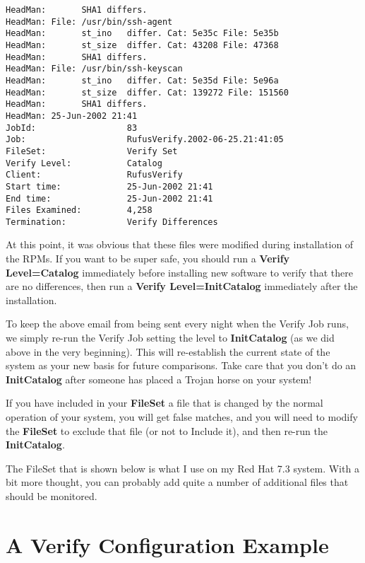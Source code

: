 \begin{verbatim}
HeadMan:       SHA1 differs.
HeadMan: File: /usr/bin/ssh-agent
HeadMan:       st_ino   differ. Cat: 5e35c File: 5e35b
HeadMan:       st_size  differ. Cat: 43208 File: 47368
HeadMan:       SHA1 differs.
HeadMan: File: /usr/bin/ssh-keyscan
HeadMan:       st_ino   differ. Cat: 5e35d File: 5e96a
HeadMan:       st_size  differ. Cat: 139272 File: 151560
HeadMan:       SHA1 differs.
HeadMan: 25-Jun-2002 21:41
JobId:                  83
Job:                    RufusVerify.2002-06-25.21:41:05
FileSet:                Verify Set
Verify Level:           Catalog
Client:                 RufusVerify
Start time:             25-Jun-2002 21:41
End time:               25-Jun-2002 21:41
Files Examined:         4,258
Termination:            Verify Differences
\end{verbatim}
\normalsize

At this point, it was obvious that these files were modified during
installation of the RPMs. If you want to be super safe, you should run a {\bf
Verify Level=Catalog} immediately before installing new software to verify
that there are no differences, then run a {\bf Verify Level=InitCatalog}
immediately after the installation.

To keep the above email from being sent every night when the Verify Job runs,
we simply re-run the Verify Job setting the level to {\bf InitCatalog} (as we
did above in the very beginning). This will re-establish the current state of
the system as your new basis for future comparisons. Take care that you don't
do an {\bf InitCatalog} after someone has placed a Trojan horse on your
system!

If you have included in your {\bf FileSet} a file that is changed by the
normal operation of your system, you will get false matches, and you will need
to modify the {\bf FileSet} to exclude that file (or not to Include it), and
then re-run the {\bf InitCatalog}.

The FileSet that is shown below is what I use on my Red Hat 7.3 system. With a
bit more thought, you can probably add quite a number of additional files that
should be monitored.

\section{A Verify Configuration Example}

